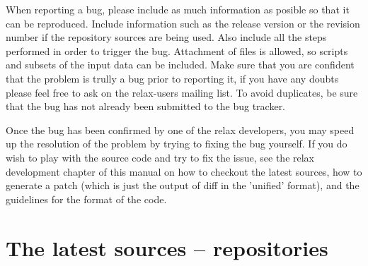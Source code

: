 When reporting a bug, please include as much information as posible so that it can be reproduced.  Include information such as the release version or the revision number if the repository sources are being used.  Also include all the steps performed in order to trigger the bug.  Attachment of files is allowed, so scripts and subsets of the input data can be included.  Make sure that you are confident that the problem is trully a bug prior to reporting it, if you have any doubts please feel free to ask on the relax-users mailing list.  To avoid duplicates, be sure that the bug has not already been submitted to the bug tracker.

Once the bug has been confirmed by one of the relax developers, you may speed up the resolution of the problem by trying to fixing the bug yourself.  If you do wish to play with the source code and try to fix the issue, see the relax development chapter of this manual on how to checkout the latest sources, how to generate a patch (which is just the output of diff in the 'unified' format), and the guidelines for the format of the code.




\section{The latest sources -- repositories}

